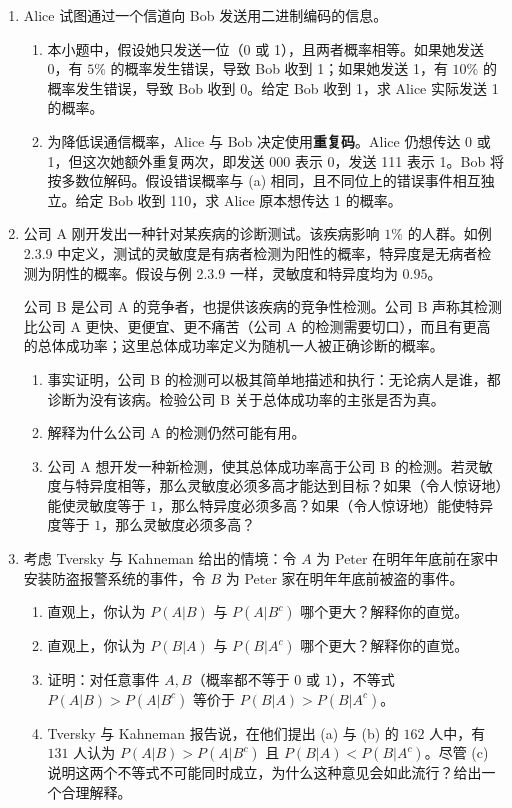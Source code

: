 \documentclass[UTF8,12pt,a4paper,fontset=fandol]{ctexart}
\begin{document}
\begin{enumerate}
  \item Alice 试图通过一个信道向 Bob 发送用二进制编码的信息。
  \begin{enumerate}
    \item 本小题中，假设她只发送一位（0 或 1），且两者概率相等。如果她发送 0，有 $5\%$ 的概率发生错误，导致 Bob 收到 1；如果她发送 1，有 $10\%$ 的概率发生错误，导致 Bob 收到 0。给定 Bob 收到 1，求 Alice 实际发送 1 的概率。
    \item 为降低误通信概率，Alice 与 Bob 决定使用\textbf{重复码}。Alice 仍想传达 0 或 1，但这次她额外重复两次，即发送 000 表示 0，发送 111 表示 1。Bob 将按多数位解码。假设错误概率与 (a) 相同，且不同位上的错误事件相互独立。给定 Bob 收到 110，求 Alice 原本想传达 1 的概率。
  \end{enumerate}

  \item 公司 A 刚开发出一种针对某疾病的诊断测试。该疾病影响 $1\%$ 的人群。如例 2.3.9 中定义，测试的灵敏度是有病者检测为阳性的概率，特异度是无病者检测为阴性的概率。假设与例 2.3.9 一样，灵敏度和特异度均为 $0.95$。

  公司 B 是公司 A 的竞争者，也提供该疾病的竞争性检测。公司 B 声称其检测比公司 A 更快、更便宜、更不痛苦（公司 A 的检测需要切口），而且有更高的总体成功率；这里总体成功率定义为随机一人被正确诊断的概率。
  \begin{enumerate}
    \item 事实证明，公司 B 的检测可以极其简单地描述和执行：无论病人是谁，都诊断为没有该病。检验公司 B 关于总体成功率的主张是否为真。
    \item 解释为什么公司 A 的检测仍然可能有用。
    \item 公司 A 想开发一种新检测，使其总体成功率高于公司 B 的检测。若灵敏度与特异度相等，那么灵敏度必须多高才能达到目标？如果（令人惊讶地）能使灵敏度等于 $1$，那么特异度必须多高？如果（令人惊讶地）能使特异度等于 $1$，那么灵敏度必须多高？
  \end{enumerate}

  \item 考虑 Tversky 与 Kahneman 给出的情境：令 $A$ 为 Peter 在明年年底前在家中安装防盗报警系统的事件，令 $B$ 为 Peter 家在明年年底前被盗的事件。
  \begin{enumerate}
    \item 直观上，你认为 $P(A|B)$ 与 $P(A|B^c)$ 哪个更大？解释你的直觉。
    \item 直观上，你认为 $P(B|A)$ 与 $P(B|A^c)$ 哪个更大？解释你的直觉。
    \item 证明：对任意事件 $A,B$（概率都不等于 $0$ 或 $1$），不等式 $P(A|B)>P(A|B^c)$ 等价于 $P(B|A)>P(B|A^c)$。
    \item Tversky 与 Kahneman 报告说，在他们提出 (a) 与 (b) 的 $162$ 人中，有 $131$ 人认为 $P(A|B)>P(A|B^c)$ 且 $P(B|A)<P(B|A^c)$。尽管 (c) 说明这两个不等式不可能同时成立，为什么这种意见会如此流行？给出一个合理解释。
  \end{enumerate}


\end{enumerate}
\end{document}
